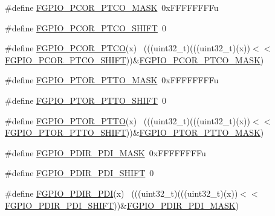 \begin{DoxyCompactItemize}
\item 
\#define \hyperlink{group___f_g_p_i_o___register___masks_ga07265e812fba9f953394d6e9dfe82aab}{F\+G\+P\+I\+O\+\_\+\+P\+C\+O\+R\+\_\+\+P\+T\+C\+O\+\_\+\+M\+A\+SK}~0x\+F\+F\+F\+F\+F\+F\+F\+Fu
\item 
\#define \hyperlink{group___f_g_p_i_o___register___masks_gaa72cbc41d1494dfea7662eede74ee2a1}{F\+G\+P\+I\+O\+\_\+\+P\+C\+O\+R\+\_\+\+P\+T\+C\+O\+\_\+\+S\+H\+I\+FT}~0
\item 
\#define \hyperlink{group___f_g_p_i_o___register___masks_ga8854e47dc40f1621f212f1e034d175e9}{F\+G\+P\+I\+O\+\_\+\+P\+C\+O\+R\+\_\+\+P\+T\+CO}(x)                                          ~(((uint32\+\_\+t)(((uint32\+\_\+t)(x))$<$$<$\hyperlink{group___f_g_p_i_o___register___masks_gaa72cbc41d1494dfea7662eede74ee2a1}{F\+G\+P\+I\+O\+\_\+\+P\+C\+O\+R\+\_\+\+P\+T\+C\+O\+\_\+\+S\+H\+I\+FT}))\&\hyperlink{group___f_g_p_i_o___register___masks_ga07265e812fba9f953394d6e9dfe82aab}{F\+G\+P\+I\+O\+\_\+\+P\+C\+O\+R\+\_\+\+P\+T\+C\+O\+\_\+\+M\+A\+SK})
\item 
\#define \hyperlink{group___f_g_p_i_o___register___masks_gab0e5427135589fc107fe4b465e5c767f}{F\+G\+P\+I\+O\+\_\+\+P\+T\+O\+R\+\_\+\+P\+T\+T\+O\+\_\+\+M\+A\+SK}~0x\+F\+F\+F\+F\+F\+F\+F\+Fu
\item 
\#define \hyperlink{group___f_g_p_i_o___register___masks_gae2127729a1021dc8d34d55a758102213}{F\+G\+P\+I\+O\+\_\+\+P\+T\+O\+R\+\_\+\+P\+T\+T\+O\+\_\+\+S\+H\+I\+FT}~0
\item 
\#define \hyperlink{group___f_g_p_i_o___register___masks_ga2f7a3e85c47496e6cfcc02acf793ae45}{F\+G\+P\+I\+O\+\_\+\+P\+T\+O\+R\+\_\+\+P\+T\+TO}(x)                                          ~(((uint32\+\_\+t)(((uint32\+\_\+t)(x))$<$$<$\hyperlink{group___f_g_p_i_o___register___masks_gae2127729a1021dc8d34d55a758102213}{F\+G\+P\+I\+O\+\_\+\+P\+T\+O\+R\+\_\+\+P\+T\+T\+O\+\_\+\+S\+H\+I\+FT}))\&\hyperlink{group___f_g_p_i_o___register___masks_gab0e5427135589fc107fe4b465e5c767f}{F\+G\+P\+I\+O\+\_\+\+P\+T\+O\+R\+\_\+\+P\+T\+T\+O\+\_\+\+M\+A\+SK})
\item 
\#define \hyperlink{group___f_g_p_i_o___register___masks_ga49077fe6b4cbd499bfa84f4b4c1be74c}{F\+G\+P\+I\+O\+\_\+\+P\+D\+I\+R\+\_\+\+P\+D\+I\+\_\+\+M\+A\+SK}~0x\+F\+F\+F\+F\+F\+F\+F\+Fu
\item 
\#define \hyperlink{group___f_g_p_i_o___register___masks_gaadc2ff381ef7eb1254eaab329f935aae}{F\+G\+P\+I\+O\+\_\+\+P\+D\+I\+R\+\_\+\+P\+D\+I\+\_\+\+S\+H\+I\+FT}~0
\item 
\#define \hyperlink{group___f_g_p_i_o___register___masks_ga6c257fc3a27a1d9f410409e335d64ef1}{F\+G\+P\+I\+O\+\_\+\+P\+D\+I\+R\+\_\+\+P\+DI}(x)                                            ~(((uint32\+\_\+t)(((uint32\+\_\+t)(x))$<$$<$\hyperlink{group___f_g_p_i_o___register___masks_gaadc2ff381ef7eb1254eaab329f935aae}{F\+G\+P\+I\+O\+\_\+\+P\+D\+I\+R\+\_\+\+P\+D\+I\+\_\+\+S\+H\+I\+FT}))\&\hyperlink{group___f_g_p_i_o___register___masks_ga49077fe6b4cbd499bfa84f4b4c1be74c}{F\+G\+P\+I\+O\+\_\+\+P\+D\+I\+R\+\_\+\+P\+D\+I\+\_\+\+M\+A\+SK})
$$
\end{DoxyCompactItemize}
